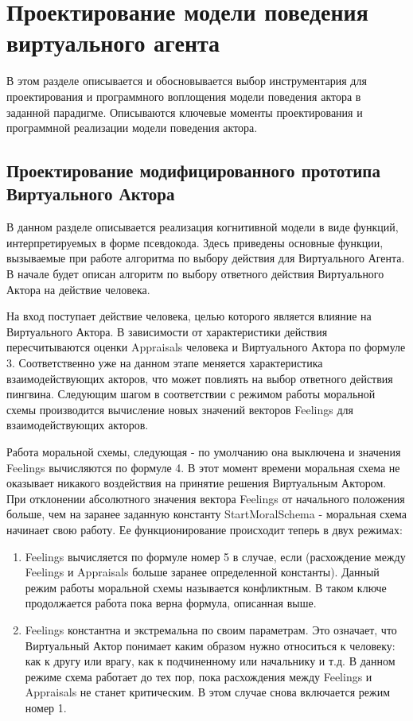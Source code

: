 \chapter{Проектирование модели поведения виртуального агента}

В этом разделе описывается и обосновывается выбор инструментария для проектирования и программного воплощения 
модели поведения актора в заданной парадигме. Описываются ключевые моменты проектирования и программной реализации модели поведения актора.

\section{Проектирование модифицированного прототипа Виртуального Актора}

В данном разделе описывается реализация когнитивной модели в виде функций, интерпретируемых в форме псевдокода. Здесь приведены основные функции, вызываемые при работе алгоритма по выбору действия для Виртуального Агента. В начале будет описан алгоритм по выбору ответного действия Виртуального Актора на действие человека. 

На вход поступает действие человека, целью которого является влияние на Виртуального Актора. В зависимости от характеристики действия пересчитываются оценки Appraisals человека и Виртуального Актора по формуле 3. Соответственно уже на данном этапе меняется характеристика взаимодействующих акторов, что может повлиять на выбор ответного действия пингвина. Следующим шагом в соответствии с режимом работы моральной схемы производится вычисление новых значений векторов Feelings для взаимодействующих акторов.

Работа моральной схемы, следующая - по умолчанию она выключена и значения Feelings вычисляются по формуле 4. В этот момент времени моральная схема не оказывает никакого воздействия на принятие решения Виртуальным Актором. При отклонении абсолютного значения вектора Feelings от начального положения больше, чем на заранее заданную константу StartMoralSchema - моральная схема начинает свою работу. Ее функционирование происходит теперь в двух режимах:
\begin{enumerate}
  \item Feelings вычисляется по формуле номер 5 в случае, если  (расхождение между Feelings и Appraisals больше заранее определенной константы). Данный режим работы моральной схемы называется конфликтным. В таком ключе продолжается работа пока верна формула, описанная выше.
  \item Feelings константна и экстремальна по своим параметрам. Это означает, что Виртуальный Актор понимает каким образом нужно относиться к человеку: как к другу или врагу, как к подчиненному или начальнику и т.д. В данном режиме схема работает до тех пор, пока расхождения между Feelings и Appraisals не станет критическим. В этом случае снова включается режим номер 1.
\end{enumerate}

